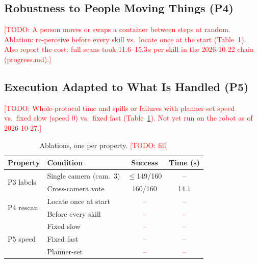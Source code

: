 \documentclass[letterpaper, 10pt, journal, twoside]{IEEEtran}}
\newcommand{\todo}[1]{\textcolor{red}{[TODO: #1]}}
\newcommand{\tbd}{\textcolor{red}{--}}
\begin{document}
\subsection{Robustness to People Moving Things (P4)}
\todo{A person moves or swaps a container between steps at random.
Ablation: re-perceive before every skill vs.\ locate once at the start
(Table~\ref{tab:ablations}). Also report the cost: full scans took
11.6--15.3\,s per skill in the 2026-10-22 chain (progress.md).}

\subsection{Execution Adapted to What Is Handled (P5)}
\todo{Whole-protocol time and spills or failures with planner-set speed
vs.\ fixed slow (speed 0) vs.\ fixed fast (Table~\ref{tab:ablations}).
Not yet run on the robot as of 2026-10-27.}

\begin{table}[t]
  \caption{Ablations, one per property. \todo{fill}}
  \label{tab:ablations}
  \centering
  \footnotesize
  \begin{tabular}{@{}llcc@{}}
    \toprule
    Property & Condition & Success & Time (s) \\
    \midrule
    \multirow{2}{*}{P3 labels}  & Single camera (cam.~3) & $\leq$149/160 & -- \\
                                & Cross-camera vote    & 160/160 & 14.1 \\
    \midrule
    \multirow{2}{*}{P4 rescan}  & Locate once at start & \tbd & \tbd \\
                                & Before every skill   & \tbd & \tbd \\
    \midrule
    \multirow{3}{*}{P5 speed}   & Fixed slow           & \tbd & \tbd \\
                                & Fixed fast           & \tbd & \tbd \\
                                & Planner-set          & \tbd & \tbd \\
    \bottomrule
  \end{tabular}
\end{table}
\end{document}
